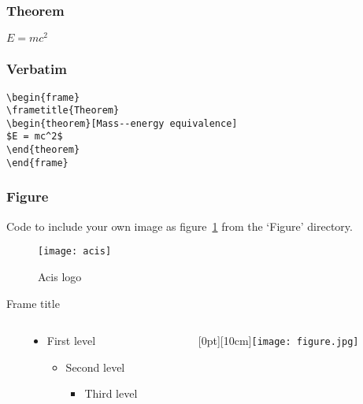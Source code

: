 \begin{frame}
  \frametitle{Theorem}
  \begin{theorem}
    $E = mc^2$
  \end{theorem}
\end{frame}


\begin{frame}[fragile] %
  \frametitle{Verbatim}
  \begin{example}
    \begin{verbatim}
\begin{frame}
\frametitle{Theorem}
\begin{theorem}[Mass--energy equivalence]
$E = mc^2$
\end{theorem}
\end{frame}\end{verbatim}
  \end{example}
\end{frame}


\begin{frame}
  \frametitle{Figure}
  Code to include your own image as figure~\ref{fig:acis} from the `Figure' directory.
  \begin{figure}
    \texttt{[image: acis]}
    \caption{Acis logo}
    \label{fig:acis}
  \end{figure}
\end{frame}

\begin{frame}{Frame title}
  \begin{columns}[onlytextwidth]\
    \begin{column}{.5\textwidth}
      \begin{itemize}
        \item First level
              \begin{itemize}
                \item Second level
                      \begin{itemize}
                        \item Third level\cite{Weng98}
                      \end{itemize}
              \end{itemize}
      \end{itemize}
    \end{column}
    \begin{column}{.5\textwidth}
      \hfill\raisebox{-10cm}[0pt][10cm]{\texttt{[image: figure.jpg]}}
    \end{column}
  \end{columns}
\end{frame}


